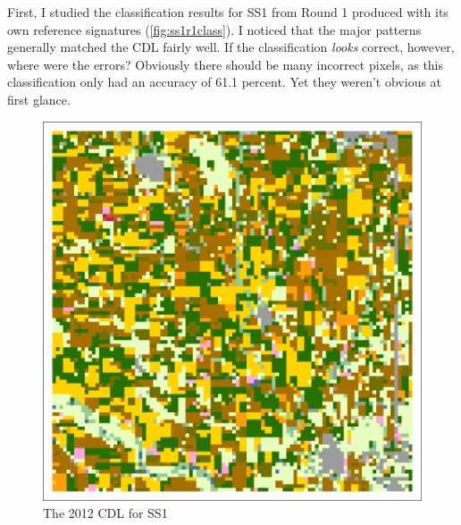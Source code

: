 First, I studied the classification results for SS1 from Round 1 produced with its own reference signatures (\autoref{fig:ss1r1class}). I noticed that the major patterns generally matched the CDL fairly well. If the classification \textit{looks} correct, however, where were the errors? Obviously there should be many incorrect pixels, as this classification only had an accuracy of 61.1 percent. Yet they weren’t obvious at first glance.

\begin{ssfigure}
  \centering
  \begin{subfigure}[t]{.475\textwidth}
    \includegraphics[width=\textwidth]{Graphics/Testing/clip1_MODIS_CDL.pdf}
    \caption{The 2012 CDL for SS1}
    \label{subfig:ss1r1CDL}
  \end{subfigure}
  \quad
  \begin{subfigure}[t]{.475\textwidth}

\end{subfigure}
\end{ssfigure}
